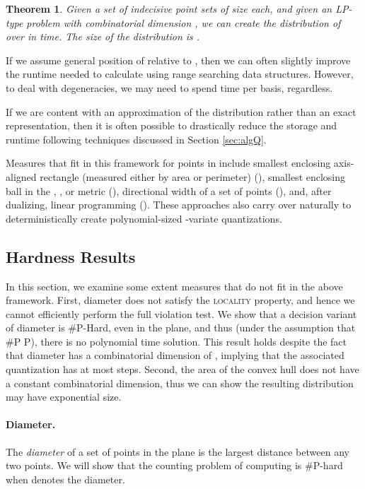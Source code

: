 \documentclass{journal}
\newtheorem {theorem}{Theorem}[section]
\begin{document}
\begin{theorem}
Given a set  of  indecisive point sets of size  each, and given an LP-type problem  with combinatorial dimension , we can create the distribution of  over  in  time.  The size of the distribution is .
\label{thm:gen-comb-dist}
\end{theorem}

If we assume general position of  relative to , then we can often slightly improve the runtime needed to calculate  using range searching data structures.  However, to deal with degeneracies, we may need to spend  time per basis, regardless.

If we are content with an approximation of the distribution rather than an exact representation, then it is often possible to drastically reduce the storage and runtime following techniques discussed in Section \ref{sec:algQ}.  

Measures that fit in this framework for points in  include smallest enclosing axis-aligned rectangle (measured either by area or perimeter) (), smallest enclosing ball in the , , or  metric (), directional width of a set of points (), and, after dualizing, linear programming ().
These approaches also carry over naturally to deterministically create polynomial-sized -variate quantizations.  


\subsection {Hardness Results}

In this section, we examine some extent measures that do not fit in the above framework.
First, diameter does not satisfy the \textsc{locality} property, and hence we cannot efficiently perform the full violation test.  
We show that a decision variant of diameter is \#P-Hard, even in the plane, and thus (under the assumption that \#P  P), there is no polynomial time solution.  This result holds despite the fact that diameter has a combinatorial dimension of , implying that the associated quantization has at most  steps.  
Second, the area of the convex hull does not have a constant combinatorial dimension, thus we can show the resulting distribution may have exponential size.  


\paragraph{Diameter.}
The \emph {diameter} of a set of points in the plane is the largest distance between any two points. We will show that the counting problem of computing  is \#P-hard when  denotes the diameter.
\end{document}
